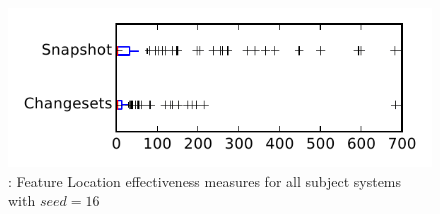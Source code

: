 
\begin{figure}
\centering
\includegraphics[height=0.4\textheight]{figures/flt_seed/rq1_tiny_16}
\caption{\rone: Feature Location effectiveness measures for all subject systems with $seed=16$}
\label{fig:flt_seed:rq1:tiny}
\end{figure}
